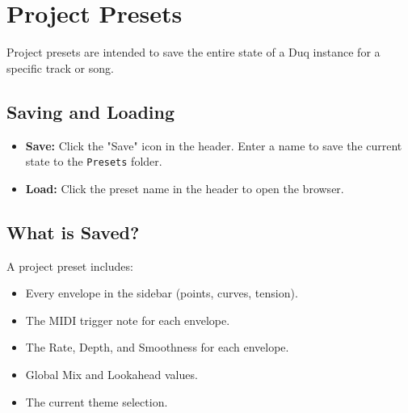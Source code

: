 \chapter{Project Presets}
\label{ch:project_presets}

Project presets are intended to save the entire state of a Duq instance for a specific track or song.

\section{Saving and Loading}
\begin{itemize}
    \item \textbf{Save:} Click the "Save" icon in the header. Enter a name to save the current state to the \texttt{Presets} folder.
    \item \textbf{Load:} Click the preset name in the header to open the browser.
\end{itemize}

\section{What is Saved?}
A project preset includes:
\begin{itemize}
    \item Every envelope in the sidebar (points, curves, tension).
    \item The MIDI trigger note for each envelope.
    \item The Rate, Depth, and Smoothness for each envelope.
    \item Global Mix and Lookahead values.
    \item The current theme selection.
\end{itemize}
